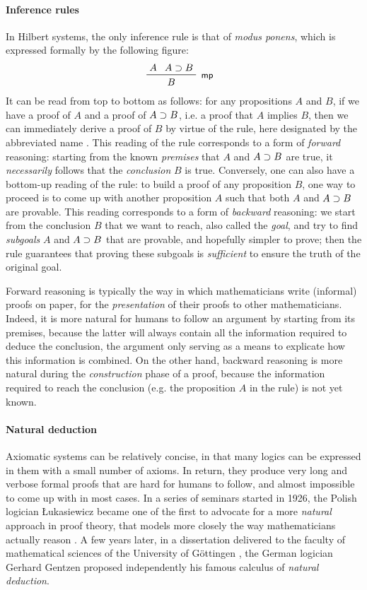 \paragraph{Inference rules}

In Hilbert systems, the only inference rule is that of \emph{modus ponens},
which is expressed formally by the following figure:
$$\R[\rsf{mp}]{A}{A \limp B}{B}$$ It can be read from top to bottom as follows:
for any propositions $A$ and $B$, if we have a proof of $A$ and a proof of $A
\supset B$, i.e. a proof that $A$ implies $B$, then we can immediately derive a
proof of $B$ by virtue of the rule, here designated by the abbreviated name
. This reading of the rule corresponds to a form of \emph{forward}
reasoning: starting from the known \emph{premises} that $A$ and $A \supset B$ are
true, it \emph{necessarily} follows that the \emph{conclusion} $B$ is true.
Conversely, one can also have a bottom-up reading of the rule: to build a proof
of any proposition $B$, one way to proceed is to come up with another
proposition $A$ such that both $A$ and $A \supset B$ are provable. This reading
corresponds to a form of \emph{backward} reasoning: we start from the conclusion
$B$ that we want to reach, also called the \emph{goal}, and try to find
\emph{subgoals} $A$ and $A \supset B$ that are provable, and hopefully simpler to
prove; then the rule guarantees that proving these subgoals is \emph{sufficient}
to ensure the truth of the original goal.

Forward reasoning is typically the way in which mathematicians write (informal)
proofs on paper, for the \emph{presentation} of their proofs to other
mathematicians. Indeed, it is more natural for humans to follow an argument by
starting from its premises, because the latter will always contain all the
information required to deduce the conclusion, the argument only serving as a
means to explicate how this information is combined. On the other hand, backward
reasoning is more natural during the \emph{construction} phase of a proof,
because the information required to reach the conclusion (e.g. the proposition
$A$ in the  rule) is not yet known.

\paragraph{Natural deduction}

Axiomatic systems can be relatively concise, in that many logics can be
expressed in them with a small number of axioms. In return, they produce very
long and verbose formal proofs that are hard for humans to follow, and almost
impossible to come up with in most cases. In a series of seminars started in
1926, the Polish logician Łukasiewicz became one of the first to advocate for a
more \emph{natural} approach in proof theory, that models more closely the way
mathematicians actually reason . A few years
later, in a dissertation delivered to the faculty of mathematical sciences of
the University of Göttingen , the German
logician Gerhard Gentzen proposed independently his famous calculus of
\emph{natural deduction}.

